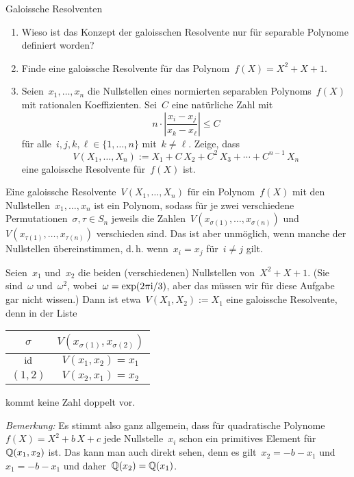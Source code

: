 \documentclass{algblatt}
\begin{document}
\begin{aufgabe}{Galoissche Resolventen}
\begin{enumerate}
\item Wieso ist das Konzept der galoisschen Resolvente nur für separable
Polynome definiert worden?

\item Finde eine galoissche Resolvente für das Polynom~$f(X) = X^2 + X + 1$.

\item Seien~$x_1,\ldots,x_n$ die Nullstellen eines normierten separablen
Polynoms~$f(X)$ mit rationalen Koeffizienten. Sei~$C$ eine natürliche Zahl mit
\[ n \cdot \left|\frac{x_i - x_j}{x_k - x_\ell}\right| \leq C \]
für alle~$i,j,k,\ell \in \{ 1,\ldots,n \}$ mit~$k \neq \ell$. Zeige, dass
\[ V(X_1,\ldots,X_n) := X_1 + C\,X_2 + C^2\,X_3 + \cdots + C^{n-1}\,X_n \]
eine galoissche Resolvente für~$f(X)$ ist.
\end{enumerate}

\begin{loesungE}
\item Eine galoissche Resolvente~$V(X_1,\ldots,X_n)$ für ein Polynom~$f(X)$ mit
den Nullstellen~$x_1,\ldots,x_n$ ist ein Polynom, sodass für je zwei
verschiedene Permutationen~$\sigma,\tau \in S_n$ jeweils die
Zahlen~$V(x_{\sigma(1)},\ldots,x_{\sigma(n)})$
und~$V(x_{\tau(1)},\ldots,x_{\tau(n)})$ verschieden sind. Das ist aber
unmöglich, wenn manche der Nullstellen übereinstimmen, d.\,h. wenn~$x_i = x_j$
für~$i \neq j$ gilt.

\item Seien~$x_1$ und~$x_2$ die beiden (verschiedenen) Nullstellen von~$X^2 + X + 1$.
(Sie sind~$\omega$ und~$\omega^2$, wobei~$\omega =
\exp(2\pi\mathrm{i}/3)$, aber das müssen wir für diese Aufgabe gar nicht wissen.) Dann
ist etwa~$V(X_1,X_2) := X_1$ eine galoissche Resolvente,
denn in der Liste
\begin{center}
  \begin{tabular}{c|c}
    $\sigma$ & $V(x_{\sigma(1)}, x_{\sigma(2)})$ \\\hline
    $\mathrm{id}$ & $V(x_1,x_2) = x_1$ \\
    $(1,2)$ & $V(x_2,x_1) = x_2$
  \end{tabular}
\end{center}
kommt keine Zahl doppelt vor.

\emph{Bemerkung:} Es stimmt also ganz allgemein, dass für quadratische
Polynome~$f(X) = X^2 + b\,X + c$ jede Nullstelle~$x_i$ schon ein primitives
Element für~$\mathbb{Q}(x_1,x_2)$ ist. Das kann man auch direkt sehen, denn es
gilt~$x_2 = -b - x_1$ und~$x_1 = -b - x_1$ und daher~$\mathbb{Q}(x_2) = \mathbb{Q}(x_1)$.


\end{loesungE}
\end{aufgabe}
\end{document}
